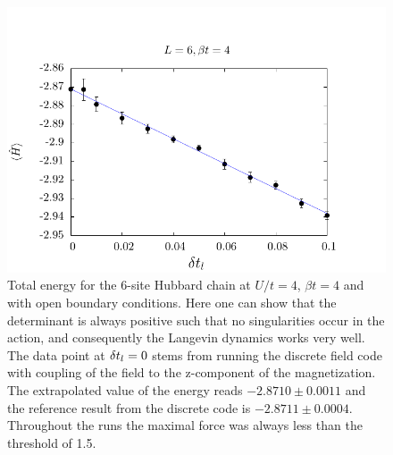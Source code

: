 \begin{figure}[H]
        \begin{center}
                \includegraphics[scale=0.9]{Figures/Langevin.pdf}
            \end{center}
        \caption{\label{Langevin.fig}   Total energy for the 6-site Hubbard chain at $U/t=4$, $\beta t = 4$ and with open boundary conditions.   Here one can show that the determinant is always positive such that  no   singularities occur in the action, and consequently the Langevin dynamics works very well.  The data point at $\delta t_{l} =0$ stems from running the  discrete  field code with coupling  of the field to the z-component of the magnetization.  The extrapolated value of the energy reads
        $-2.8710   \pm 0.0011$
        and the reference result from the discrete code is
        $-2.8711   \pm  0.0004 $.
        Throughout the runs the maximal force was always less than the threshold of 1.5.   }
\end{figure}

